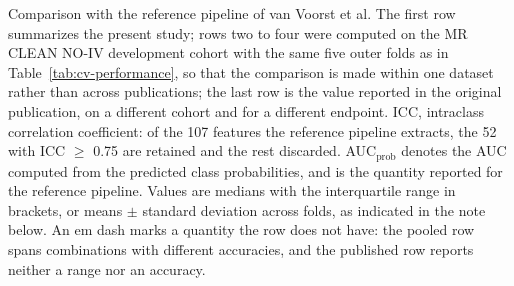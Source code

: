 \clearpage

\begin{table}[htbp]
\centering
\caption{Comparison with the reference pipeline of van Voorst et al. \cite{vanVoorst2022} The first row summarizes the present study; rows two to four were computed on the MR CLEAN NO-IV development cohort with the same five outer folds as in Table~\ref{tab:cv-performance}, so that the comparison is made within one dataset rather than across publications; the last row is the value reported in the original publication, on a different cohort and for a different endpoint. ICC, intraclass correlation coefficient: of the 107 features the reference pipeline extracts, the 52 with ICC $\geq$ 0.75 are retained and the rest discarded. AUC$_{\text{prob}}$ denotes the AUC computed from the predicted class probabilities, and is the quantity reported for the reference pipeline. Values are medians with the interquartile range in brackets, or means $\pm$ standard deviation across folds, as indicated in the note below. An em dash marks a quantity the row does not have: the pooled row spans combinations with different accuracies, and the published row reports neither a range nor an accuracy.}
\label{tab:reference-comparison}
\smallskip

\end{table}

